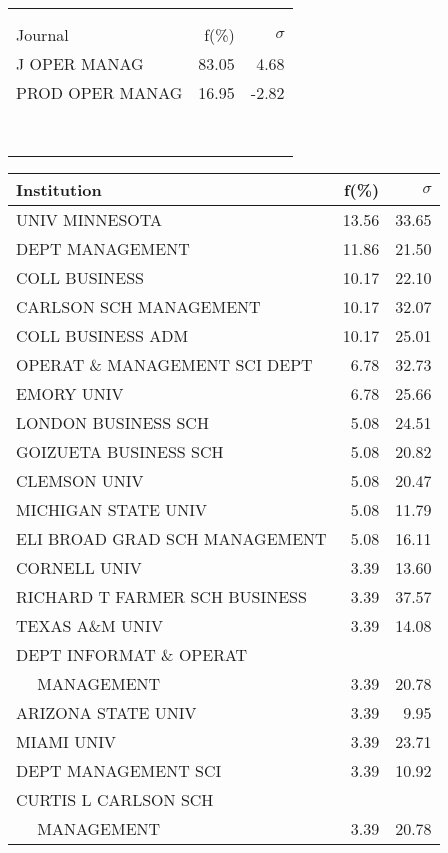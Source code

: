 \documentclass[a4paper,11pt]{report}
\begin{document}
\begin{landscape}
\begin{table}[!ht]
{\begin{tabular}{|l r  r|}
 &  & \\
 &  & \\
\hline
\hline
Journal & f(\%) & $\sigma$\\
\hline
J OPER MANAG & 83.05 & 4.68\\
PROD OPER MANAG & 16.95 & -2.82\\
 &  & \\
 &  & \\
 &  & \\
 &  & \\
 &  & \\
 &  & \\
 &  & \\
 &  & \\
\hline
\end{tabular}
}
{\scriptsize\begin{tabular}{|l r r|}
\hline
Institution & f(\%) & $\sigma$\\
\hline
UNIV MINNESOTA & 13.56 & 33.65\\
DEPT MANAGEMENT & 11.86 & 21.50\\
COLL BUSINESS & 10.17 & 22.10\\
CARLSON SCH MANAGEMENT & 10.17 & 32.07\\
COLL BUSINESS ADM & 10.17 & 25.01\\
OPERAT \& MANAGEMENT SCI DEPT & 6.78 & 32.73\\
EMORY UNIV & 6.78 & 25.66\\
LONDON BUSINESS SCH & 5.08 & 24.51\\
GOIZUETA BUSINESS SCH & 5.08 & 20.82\\
CLEMSON UNIV & 5.08 & 20.47\\
MICHIGAN STATE UNIV & 5.08 & 11.79\\
ELI BROAD GRAD SCH MANAGEMENT & 5.08 & 16.11\\
CORNELL UNIV & 3.39 & 13.60\\
RICHARD T FARMER SCH BUSINESS & 3.39 & 37.57\\
TEXAS A\&M UNIV & 3.39 & 14.08\\
DEPT INFORMAT \& OPERAT &  & \\
$\quad$ MANAGEMENT & 3.39 & 20.78\\
ARIZONA STATE UNIV & 3.39 & 9.95\\
MIAMI UNIV & 3.39 & 23.71\\
DEPT MANAGEMENT SCI & 3.39 & 10.92\\
CURTIS L CARLSON SCH &  & \\
$\quad$ MANAGEMENT & 3.39 & 20.78\\

\end{tabular}}
\end{table}
\end{landscape}
\end{document}
